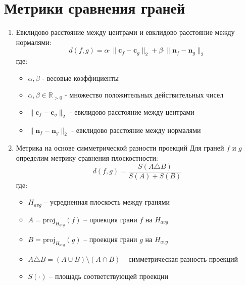 \documentclass[a4paper,14pt]{extarticle}
\theoremstyle{remark} %
\begin{document}
\section{Метрики сравнения граней}
\begin{enumerate}
    \item Евклидово расстояние между центрами и евклидово расстояние между нормалями:
        \begin{equation}
            d(f,g) = \alpha \cdot \|\mathbf{c}_f - \mathbf{c}_g\|_2 + \beta \cdot \|\mathbf{n}_f - \mathbf{n}_g\|_2
        \end{equation}
        \noindent где:
        \begin{itemize}
            \item $\alpha, \beta$ - весовые коэффициенты
            \item $\alpha, \beta \in \mathbb{R}_{>0}$ - множество положительных действительных чисел
            \item $\|\mathbf{c}_f - \mathbf{c}_g\|_2$ - евклидово расстояние между центрами
            \item $\|\mathbf{n}_f - \mathbf{n}_g\|_2$ - евклидово расстояние между нормалями
        \end{itemize}

    \item Метрика на основе симметрической разности проекций
        Для граней $f$ и $g$ определим метрику сравнения плоскостности:
        \begin{equation}
            d(f,g) = \frac{S(A \triangle B)}{S(A) + S(B)}
        \end{equation}
        где:
        \begin{itemize}
            \item $H_{avg}$ -- усредненная плоскость между гранями

            \item $A = \text{proj}_{H_{avg}}(f)$ -- проекция грани $f$ на $H_{avg}$

            \item $B = \text{proj}_{H_{avg}}(g)$ -- проекция грани $g$ на $H_{avg}$

            \item $A \triangle B = (A \cup B) \setminus (A \cap B)$ -- симметрическая разность проекций

            \item $S(\cdot)$ -- площадь соответствующей проекции
        \end{itemize}


\end{enumerate}
\end{document}
